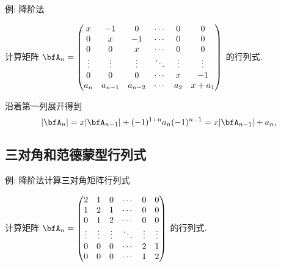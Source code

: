\begin{frame}{例: 降阶法}
	\beqskip{3pt}
	\onslide<+->
	\begin{example}
		计算矩阵 $\bfA_n=\begin{pmatrix}
			   x   &   -1    &    0    &\cdots&   0  &   0  \\
			   0   &    x    &   -1    &\cdots&   0  &   0  \\
			   0   &    0    &    x    &\cdots&   0  &   0  \\
			\vdots &  \vdots & \vdots  &\ddots&\vdots&\vdots\\
			   0   &    0    &    0    &\cdots&   x  &  -1  \\
				a_n  & a_{n-1} & a_{n-2} &\cdots&  a_2 & x+a_1
		\end{pmatrix}$ 的行列式.
	\end{example}
	\onslide<+->
	\begin{solution}
		沿着第一列展开得到
		\[|\bfA_n|=x|\bfA_{n-1}|+(-1)^{1+n}a_n(-1)^{n-1}=x|\bfA_{n-1}|+a_n,\]
	\vspace{-\baselineskip}
	\end{solution}
	\endgroup
\end{frame}

\subsection{三对角和范德蒙型行列式}

\begin{frame}{例: 降阶法计算三对角矩阵行列式}
	\onslide<+->
	\begin{example}
		计算矩阵 $\bfA_n=\begin{pmatrix}
				2  &   1  &   0  &\cdots&   0  &   0  \\
				1  &   2  &   1  &\cdots&   0  &   0  \\
				0  &   1  &   2  &\cdots&   0  &   0  \\
			\vdots&\vdots&\vdots&\ddots&\vdots&\vdots\\
				0  &   0  &   0  &\cdots&   2  &   1  \\
				0  &   0  &   0  &\cdots&   1  &   2  \\
		\end{pmatrix}$ 的行列式.
	\end{example}
\end{frame}


